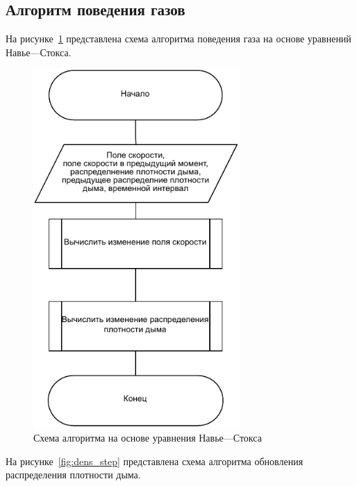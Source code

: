 \subsection{Алгоритм поведения газов}

На рисунке~\ref{fig:Navie-Stocks} представлена схема алгоритма поведения газа на основе уравнений Навье---Стокса. 
\begin{figure}[H]
	\centering
	\includegraphics[width=0.7\textwidth, page=1]{assets/img/Naive_stocks.pdf}   
	\caption{Схема алгоритма на основе уравнения Навье---Стокса}
	\label{fig:Navie-Stocks}
\end{figure}

На рисунке~\ref{fig:dens_step} представлена схема алгоритма обновления распределения плотности дыма.

